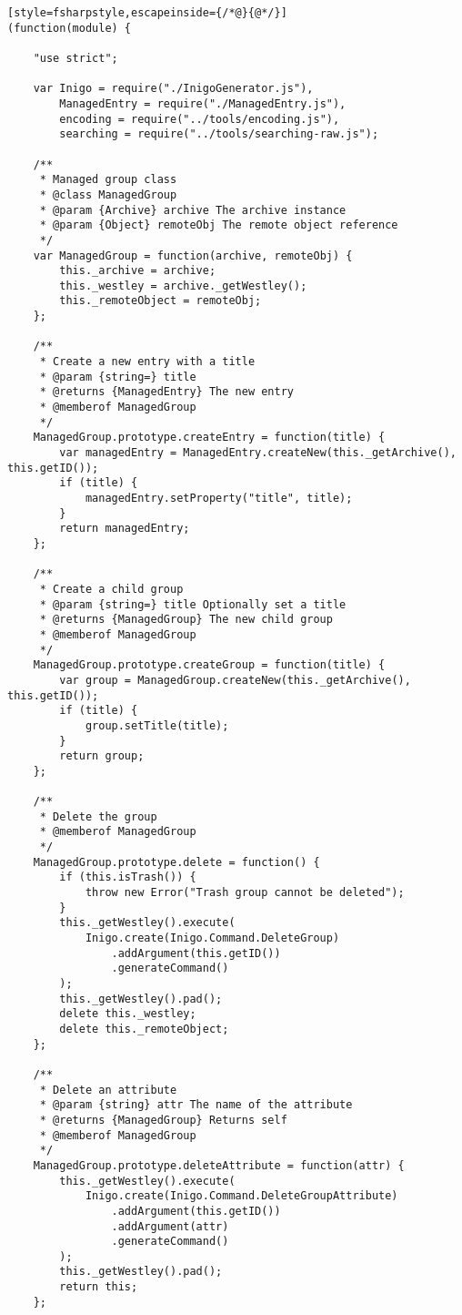 
\begin{lstlisting}[style=fsharpstyle,escapeinside={/*@}{@*/}]
(function(module) {

    "use strict";

    var Inigo = require("./InigoGenerator.js"),
        ManagedEntry = require("./ManagedEntry.js"),
        encoding = require("../tools/encoding.js"),
        searching = require("../tools/searching-raw.js");

    /**
     * Managed group class
     * @class ManagedGroup
     * @param {Archive} archive The archive instance
     * @param {Object} remoteObj The remote object reference
     */
    var ManagedGroup = function(archive, remoteObj) {
        this._archive = archive;
        this._westley = archive._getWestley();
        this._remoteObject = remoteObj;
    };

    /**
     * Create a new entry with a title
     * @param {string=} title
     * @returns {ManagedEntry} The new entry
     * @memberof ManagedGroup
     */
    ManagedGroup.prototype.createEntry = function(title) {
        var managedEntry = ManagedEntry.createNew(this._getArchive(), this.getID());
        if (title) {
            managedEntry.setProperty("title", title);
        }
        return managedEntry;
    };

    /**
     * Create a child group
     * @param {string=} title Optionally set a title
     * @returns {ManagedGroup} The new child group
     * @memberof ManagedGroup
     */
    ManagedGroup.prototype.createGroup = function(title) {
        var group = ManagedGroup.createNew(this._getArchive(), this.getID());
        if (title) {
            group.setTitle(title);
        }
        return group;
    };

    /**
     * Delete the group
     * @memberof ManagedGroup
     */
    ManagedGroup.prototype.delete = function() {
        if (this.isTrash()) {
            throw new Error("Trash group cannot be deleted");
        }
        this._getWestley().execute(
            Inigo.create(Inigo.Command.DeleteGroup)
                .addArgument(this.getID())
                .generateCommand()
        );
        this._getWestley().pad();
        delete this._westley;
        delete this._remoteObject;
    };

    /**
     * Delete an attribute
     * @param {string} attr The name of the attribute
     * @returns {ManagedGroup} Returns self
     * @memberof ManagedGroup
     */
    ManagedGroup.prototype.deleteAttribute = function(attr) {
        this._getWestley().execute(
            Inigo.create(Inigo.Command.DeleteGroupAttribute)
                .addArgument(this.getID())
                .addArgument(attr)
                .generateCommand()
        );
        this._getWestley().pad();
        return this;
    };


\end{lstlisting}
